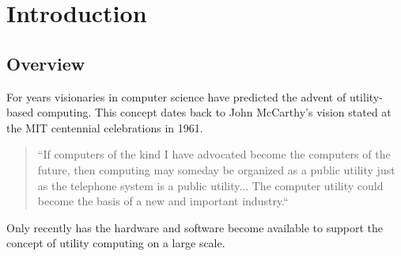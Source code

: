 
\chapter{Introduction}
\label{chap:intro}

\section{Overview}
\label{sec:overview}

\begin{comment}
\TODO{Give quick very high level view. 

Provide insightful quote regarding scientific computation 

Breifly describe current state of Distributed Systems.

Introduce the importance and impact of HPC.

Introduce need/desire for flexible utility computing.
- list major virtualization advantages

Describe major differences between HPC and cloud

Define how a merger between HPC and Cloud computing is desired.

Introduce how Virtual Clusters, can do this.
- what is a virtual cluster? What is it not?
- Missing performance considerations.

}
\end{comment}


For years visionaries in computer science have predicted the advent of utility-based computing.  This concept dates back to John McCarthy's vision stated at the MIT centennial celebrations in 1961.

\begin{quote}
``If computers of the kind I have advocated become the computers of the future, then computing may someday be organized as a public utility just as the telephone system is a public utility... The computer utility could become  the basis of a new and important industry.``
\end{quote}
 Only recently has the hardware and software become available to support the concept of utility computing on a large scale.

